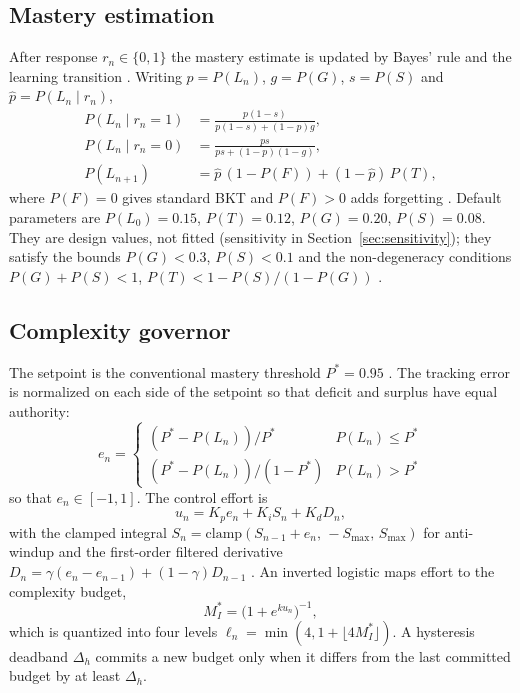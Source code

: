 \documentclass[conference]{IEEEtran}
\begin{document}
\subsection{Mastery estimation}
After response $r_n\in\{0,1\}$ the mastery estimate is updated by Bayes' rule
and the learning transition \cite{corbett1995knowledge}. Writing
$p=P(L_n)$, $g=P(G)$, $s=P(S)$ and $\hat p=P(L_n\mid r_n)$,
\begin{align}
P(L_n\mid r_n{=}1) &= \frac{p(1-s)}{p(1-s) + (1-p)g},\\
P(L_n\mid r_n{=}0) &= \frac{ps}{ps + (1-p)(1-g)},\\
P(L_{n+1}) &= \hat p\,(1-P(F)) + (1-\hat p)\,P(T),
\end{align}
where $P(F)=0$ gives standard BKT and $P(F)>0$ adds forgetting
\cite{khajah2016deep}. Default parameters are $P(L_0)=0.15$, $P(T)=0.12$,
$P(G)=0.20$, $P(S)=0.08$. They are design values, not fitted (sensitivity in Section~\ref{sec:sensitivity}); they satisfy
the bounds $P(G)<0.3$, $P(S)<0.1$ \cite{corbett1995knowledge} and the
non-degeneracy conditions $P(G)+P(S)<1$, $P(T)<1-P(S)/(1-P(G))$
\cite{vandesande2013properties}.

\subsection{Complexity governor}
The setpoint is the conventional mastery threshold $P^*=0.95$
\cite{corbett1995knowledge,zhang2025mastery}. The tracking error is normalized
on each side of the setpoint so that deficit and surplus have equal
authority:
\begin{equation}
e_n=\begin{cases}(P^*-P(L_n))/P^* & P(L_n)\le P^*\\
(P^*-P(L_n))/(1-P^*) & P(L_n)>P^*\end{cases}
\end{equation}
so that $e_n\in[-1,1]$.
The control effort is
\begin{equation}
u_n = K_p e_n + K_i S_n + K_d D_n,
\end{equation}
with the clamped integral $S_n=\mathrm{clamp}(S_{n-1}+e_n,\,-S_{\max},\,S_{\max})$
for anti-windup \cite{astrom1989windup} and the first-order filtered derivative
$D_n=\gamma(e_n-e_{n-1})+(1-\gamma)D_{n-1}$ \cite{astrom2006advanced}. An
inverted logistic maps effort to the complexity budget,
\begin{equation}
M_I^* = \bigl(1+e^{k u_n}\bigr)^{-1},
\end{equation}
which is quantized into four levels $\ell_n=\min(4,1+\lfloor 4M_I^*\rfloor)$. A
hysteresis deadband $\Delta_h$ commits a new budget only when it differs from
the last committed budget by at least $\Delta_h$.
\end{document}
